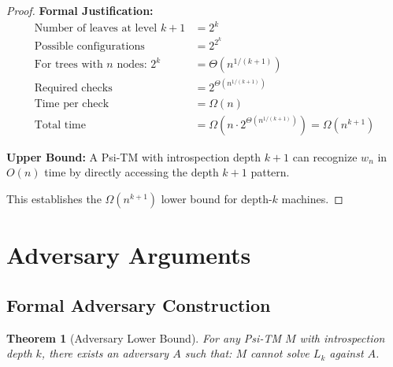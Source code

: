 \documentclass[11pt]{article}
\newtheorem{theorem}{Theorem}
\begin{document}
\begin{proof}
\textbf{Formal Justification:}
\begin{align*}
\text{Number of leaves at level } k+1 &= 2^k \\
\text{Possible configurations} &= 2^{2^k} \\
\text{For trees with } n \text{ nodes: } 2^k &= \Theta(n^{1/(k+1)}) \\
\text{Required checks} &= 2^{\Theta(n^{1/(k+1)})} \\
\text{Time per check} &= \Omega(n) \\
\text{Total time} &= \Omega(n \cdot 2^{\Theta(n^{1/(k+1)})}) = \Omega(n^{k+1})
\end{align*}

\textbf{Upper Bound:}
A Psi-TM with introspection depth $k+1$ can recognize $w_n$ in $O(n)$ time by directly accessing the depth $k+1$ pattern.

This establishes the $\Omega(n^{k+1})$ lower bound for depth-$k$ machines.
\end{proof}

\section{Adversary Arguments}

\subsection{Formal Adversary Construction}

\begin{theorem}[Adversary Lower Bound]
\label{thm:adversary-lower-bound}
For any Psi-TM $M$ with introspection depth $k$, there exists an adversary $A$ such that:
$M$ cannot solve $L_k$ against $A$.
\end{theorem}
\end{document}
